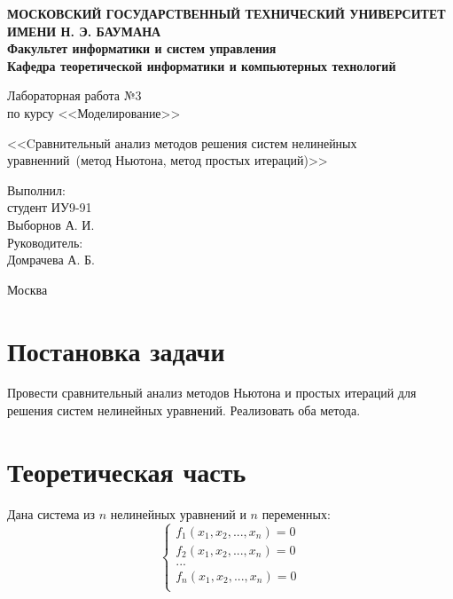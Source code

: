 \documentclass[12pt,a4paper,oneside]{extarticle}
\begin{document}
\pgfplotsset{compat=1.8}

\thispagestyle{empty}
\newpage
{
\centering


\textbf{
МОСКОВСКИЙ ГОСУДАРСТВЕННЫЙ ТЕХНИЧЕСКИЙ УНИВЕРСИТЕТ ИМЕНИ Н. Э. БАУМАНА \\
Факультет информатики и систем управления \\
Кафедра теоретической информатики и компьютерных технологий}
\bigskip
\bigskip
\bigskip
\bigskip
\bigskip
\bigskip
\bigskip

\vfill


Лабораторная работа №3 \\
по курсу <<Моделирование>>

\bigskip

{\large <<Cравнительный анализ методов решения систем нелинейных уравненний~(метод Ньютона, метод простых итераций)>>}
\bigskip

\vfill



\hfill\parbox{4cm} {
Выполнил:\\
студент ИУ9-91 \hfill \\
Выборнов А. И.\hfill \medskip\\
Руководитель:\\
Домрачева А. Б.\hfill
}


\vspace{\fill}

Москва \number\year
\clearpage
}



\clearpage


\section{Постановка задачи}
    Провести сравнительный анализ методов Ньютона и простых итераций для решения систем нелинейных уравнений. Реализовать оба метода.

\section{Теоретическая часть}
    Дана система из $n$ нелинейных уравнений и $n$ переменных:
    \begin{equation*}
        \begin{cases}
            f_1(x_1, x_2, ..., x_n) = 0 \\
            f_2(x_1, x_2, ..., x_n) = 0 \\
            ... \\
            f_n(x_1, x_2, ..., x_n) = 0 \\
        \end{cases}
    \end{equation*}    
\end{document}
